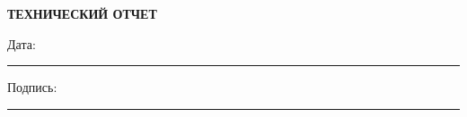 \documentclass[12pt]{article}
\begin{document}
\begin{center}
\textbf{\LARGE ТЕХНИЧЕСКИЙ ОТЧЕТ}
\end{center}

\vspace{1cm}


\vfill

\noindent
Дата: \rule{5cm}{0.4pt} \hfill Подпись: \rule{5cm}{0.4pt}
\end{document}
